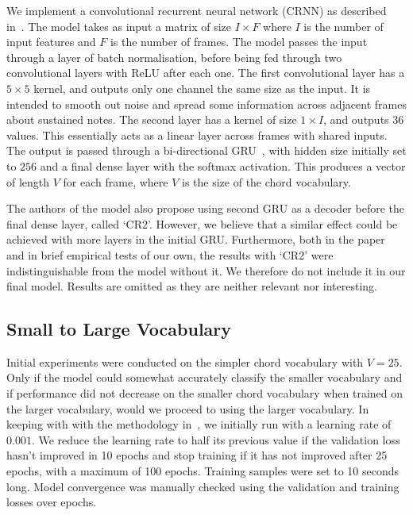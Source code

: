 We implement a convolutional recurrent neural network (CRNN) as described in~\citet{StructuredTraining}. The model takes as input a matrix of size $I \times F$ where $I$ is the number of input features and $F$ is the number of frames. The model passes the input through a layer of batch normalisation, before being fed through two convolutional layers with ReLU after each one. The first convolutional layer has a $5\times 5$ kernel, and outputs only one channel the same size as the input. It is intended to smooth out noise and spread some information across adjacent frames about sustained notes. The second layer has a kernel of size $1\times I$, and outputs 36 values. This essentially acts as a linear layer across frames with shared inputs. The output is passed through a bi-directional GRU~\citep{GRU}, with hidden size initially set to $256$ and a final dense layer with the softmax activation. This produces a vector of length $V$ for each frame, where $V$ is the size of the chord vocabulary.

The authors of the model also propose using second GRU as a decoder before the final dense layer, called `CR2'. However, we believe that a similar effect could be achieved with more layers in the initial GRU. Furthermore, both in the paper and in brief empirical tests of our own, the results with `CR2' were indistinguishable from the model without it. We therefore do not include it in our final model. Results are omitted as they are neither relevant nor interesting.

\subsection{Small to Large Vocabulary}

Initial experiments were conducted on the simpler chord vocabulary with $V=25$. Only if the model could somewhat accurately classify the smaller vocabulary and if performance did not decrease on the smaller chord vocabulary when trained on the larger vocabulary, would we proceed to using the larger vocabulary. In keeping with with the methodology in~\citet{StructuredTraining}, we initially run with a learning rate of $0.001$. We reduce the learning rate to half its previous value if the validation loss hasn't improved in 10 epochs and stop training if it has not improved after 25 epochs, with a maximum of 100 epochs. Training samples were set to 10 seconds long. Model convergence was manually checked using the validation and training losses over epochs.

